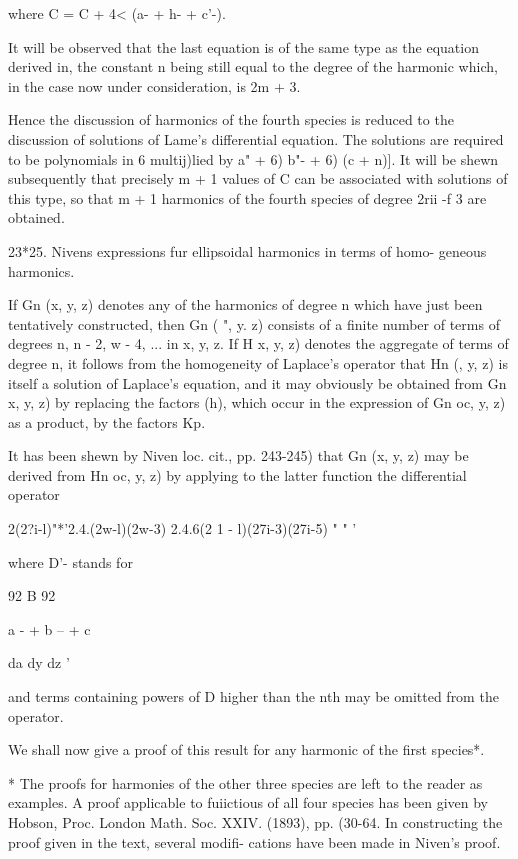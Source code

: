 {where C = C + 4< (a- + h- + c'-).

It will be observed that the last equation is of the same type as the
equation derived in, the constant n being still equal to the
degree of the harmonic which, in the case now under consideration, is
2m + 3.

Hence the discussion of harmonics of the fourth species is reduced to
the discussion of solutions of Lame's differential equation. The
solutions are required to be polynomials in 6 multij)lied by \/ a" +
6) b"- + 6) (c + n)]. It will be shewn subsequently that precisely m +
1 values of C can be associated with solutions of this type, so that m
+ 1 harmonics of the fourth species of degree 2rii -f 3 are obtained.

23*25. Nivens expressions fur ellipsoidal harmonics in terms of homo-
geneous harmonics.

If Gn (x, y, z) denotes any of the harmonics of degree n which have
just been tentatively constructed, then Gn ( ", y. z) consists of a
finite number of terms of degrees n, n - 2, w - 4, ... in x, y, z. If
H x, y, z) denotes the aggregate of terms of degree n, it follows from
the homogeneity of Laplace's operator that Hn (, y, z) is itself a
solution of Laplace's equation, and it may obviously be obtained from
Gn x, y, z) by replacing the factors (h), which occur in the
expression of Gn oc, y, z) as a product, by the factors Kp.

It has been shewn by Niven loc. cit., pp. 243-245) that Gn (x, y, z)
may be derived from Hn oc, y, z) by applying to the latter function
the differential operator

2(2?i-l)"*'2.4.(2w-l)(2w-3) 2.4.6(2 1 - l)(27i-3)(27i-5) " " '

where D'- stands for

92 B 92

a - + b -- + c ~ 

da dy dz '

and terms containing powers of D higher than the nth may be omitted
from the operator.

We shall now give a proof of this result for any harmonic of the first
species*.

* The proofs for harmonies of the other three species are left to the
reader as examples. A proof applicable to fuiictious of all four
species has been given by Hobson, Proc. London Math. Soc. XXIV.
(1893), pp. (30-64. In constructing the proof given in the text,
several modifi- cations have been made in Niven's proof.

}
